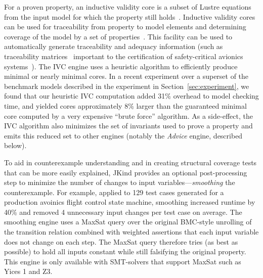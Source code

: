 \documentclass{llncs}
\newcommand{\jkind}{{\sc JKind}\xspace}
\newcommand{\lustre}{{\sc Lustre}\xspace}
\newcommand{\yices}{{\sc Yices}\xspace}
\newcommand{\zthree}{{\sc Z3}\xspace}
\renewcommand{\paragraph}[1]{\vspace{5pt}\noindent {\bf #1}}
\begin{document}
\paragraph{Inductive Validity Cores (IVC).} For a proven property, an inductive validity core is a subset of \lustre equations from the input model for which the property still
holds~\cite{ghassabani2016fse,Ghass17AllIVCs}.  Inductive validity cores can be used for traceability from property to model elements and determining coverage of the model by a set of properties~\cite{Ghass17Cov}.  This facility can be used to automatically generate traceability and adequacy information (such as traceability matrices~\cite{fifarek2017nfm} important to the certification of safety-critical avionics systems~\cite{DO178C}).
The IVC engine uses a heuristic algorithm to efficiently produce minimal or nearly minimal cores.   In a recent experiment over a superset of the benchmark models described in the experiment in Section~\ref{sec:experiment}, we found that our heuristic IVC computation added 31\% overhead to model checking time, and yielded cores approximately 8\% larger than the guaranteed minimal core computed by a very expensive ``brute force'' algorithm.  As a side-effect, the IVC algorithm also minimizes the set of invariants used to prove a property and emits this reduced set to other engines (notably the {\em Advice} engine, described below).


\paragraph{Smoothing.}  To aid in counterexample understanding and in
creating structural coverage tests that can be more easily explained,
\jkind provides an optional post-processing step to minimize the
number of changes to input variables---{\em smoothing} the
counterexample.  For example, applied to 129 test cases generated for
a production avoinics flight control state machine, smoothing
increased runtime by 40\% and removed 4 unnecessary input changes per
test case on average.  The smoothing engine uses a {\sc MaxSat} query
over the original BMC-style unrolling of the transition relation
combined with weighted assertions that each input variable does not
change on each step. The {\sc MaxSat} query therefore tries (as best
as possible) to hold all inputs constant while still falsifying the
original property. This engine is only available with SMT-solvers that
support {\sc MaxSat} such as \yices 1 and \zthree.
\end{document}
